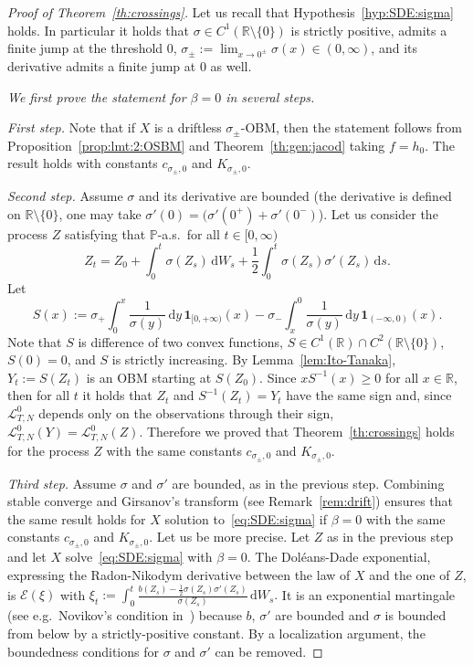 \documentclass[12pt]{article}
\numberwithin{equation}{section}
\theoremstyle{definition}
\theoremstyle{remark}
\newcommand{\RR}{\mathbb{R}}
\newcommand{\PP}{\mathbb{P}}
\newcommand{\ind}[1]{\mathbf{1}_{#1}}
\newcommand{\vd}{\,\mathrm{d}}
\begin{document}
\begin{proof}[Proof of Theorem~\ref{th:crossings}]
Let us recall that Hypothesis~\ref{hyp:SDE:sigma} holds. 
In particular it holds that $\sigma \in C^1(\RR\setminus\{0\})$ is strictly positive, 
admits a finite jump at the threshold $0$, 
$\sigma_\pm:=\lim_{x\to 0^\pm} \sigma(x)\in (0,\infty)$, and its derivative admits a finite jump at $0$ as well.

{\it We first prove the statement for $\beta=0$ in several steps.}

{\it First step.} Note that if $X$ is a driftless $\sigma_\pm$-OBM, then the statement follows from 
Proposition~\ref{prop:lmt:2:OSBM} 
and
Theorem~\ref{th:gen:jacod} taking $f=h_0$. 
The result holds with constants $c_{\sigma_\pm,0}$ and $K_{\sigma_\pm,0}$.


{\it Second step.} Assume $\sigma$ and its derivative are bounded (the derivative is defined on ${\RR\setminus\{0\}}$, one may take $\sigma'(0)=(\sigma'(0^+)+\sigma'(0^-)$). 
Let us consider the process $Z$ satisfying that $\PP$-a.s.~for all $t\in [0,\infty)$
\[ 
	Z_t= Z_0 + \int_0^t \sigma(Z_s) \vd W_s + \frac12 \int_0^t \sigma(Z_s) \sigma'(Z_s) \vd s.
\]
%
Let 
\[
	S(x):=  \sigma_+ \int_0^x \frac{1}{\sigma(y)}\vd y \, \ind{[0,+\infty)}(x) -  \sigma_- \int_x^0 \frac{1}{\sigma(y)}\vd y  \, \ind{(-\infty,0)}(x).
\]
Note that $S$ is difference of two convex functions, $S\in C^1(\RR) \cap C^2(\RR\setminus\{0\})$, $S(0)=0$, and $S$ is strictly increasing.
%
By Lemma~\ref{lem:Ito-Tanaka}, $Y_t:=S(Z_t)$ is an OBM 
starting at $S(Z_0)$.
Since $x S^{-1}(x) \geq 0$ for all $x\in \RR$, then for all $t$ it holds that $Z_t$ and $S^{-1}(Z_t)=Y_t$ have the same sign and, since $\mathcal{L}^0_{T,N}$ depends only on the observations through their sign, 
$\mathcal{L}^0_{T,N}(Y) =\mathcal{L}^0_{T,N}(Z)$.
Therefore we proved that Theorem~\ref{th:crossings} holds for the process $Z$ with the same constants $c_{\sigma_\pm,0}$ and $K_{\sigma_\pm,0}$. %

{\it Third step.} Assume $\sigma$ and $\sigma'$ are bounded, as in the previous step. Combining stable converge and Girsanov's transform (see Remark~\ref{rem:drift}) ensures that the same result holds for $X$ solution to~\eqref{eq:SDE:sigma} if $\beta=0$ with the same constants $c_{\sigma_\pm,0}$ and $K_{\sigma_\pm,0}$. 
%
Let us be more precise. 
Let $Z$ as in the previous step and let $X$ solve~\eqref{eq:SDE:sigma} with $\beta=0$.
The Dol\'eans-Dade exponential, expressing the Radon-Nikodym derivative between the law of $X$ and the one of $Z$, is $\mathcal{E}(\xi)$ with 
$
	\xi_t := \int_0^t \frac{b(Z_s)-\frac12 \sigma(Z_s) \sigma'(Z_s)}{\sigma(Z_s)} \vd W_s.
$ 
It is an exponential martingale (see e.g.~Novikov's condition in~\cite[Corollary 3.5.14]{ks}) because $b$, $\sigma'$ are bounded and $\sigma$ is bounded from below by a strictly-positive constant.
%
By a localization argument, the boundedness conditions for $\sigma$ and $\sigma'$ can be removed.



\end{proof}
\end{document}
